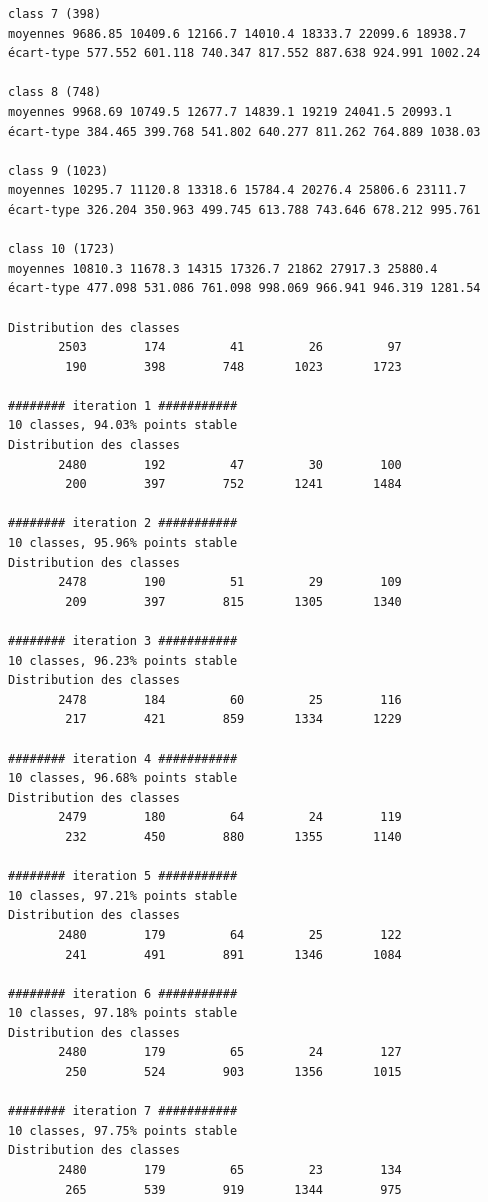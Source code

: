 \documentclass[earth,article,accept,pdftex,moreauthors]{Definitions/mdpi}
\begin{document}
{\begin{scriptsize}
\begin{verbatim}
class 7 (398)
moyennes 9686.85 10409.6 12166.7 14010.4 18333.7 22099.6 18938.7
écart-type 577.552 601.118 740.347 817.552 887.638 924.991 1002.24

class 8 (748)
moyennes 9968.69 10749.5 12677.7 14839.1 19219 24041.5 20993.1
écart-type 384.465 399.768 541.802 640.277 811.262 764.889 1038.03

class 9 (1023)
moyennes 10295.7 11120.8 13318.6 15784.4 20276.4 25806.6 23111.7
écart-type 326.204 350.963 499.745 613.788 743.646 678.212 995.761

class 10 (1723)
moyennes 10810.3 11678.3 14315 17326.7 21862 27917.3 25880.4
écart-type 477.098 531.086 761.098 998.069 966.941 946.319 1281.54

Distribution des classes
       2503        174         41         26         97
        190        398        748       1023       1723

######## iteration 1 ###########
10 classes, 94.03% points stable
Distribution des classes
       2480        192         47         30        100
        200        397        752       1241       1484

######## iteration 2 ###########
10 classes, 95.96% points stable
Distribution des classes
       2478        190         51         29        109
        209        397        815       1305       1340

######## iteration 3 ###########
10 classes, 96.23% points stable
Distribution des classes
       2478        184         60         25        116
        217        421        859       1334       1229

######## iteration 4 ###########
10 classes, 96.68% points stable
Distribution des classes
       2479        180         64         24        119
        232        450        880       1355       1140

######## iteration 5 ###########
10 classes, 97.21% points stable
Distribution des classes
       2480        179         64         25        122
        241        491        891       1346       1084

######## iteration 6 ###########
10 classes, 97.18% points stable
Distribution des classes
       2480        179         65         24        127
        250        524        903       1356       1015

######## iteration 7 ###########
10 classes, 97.75% points stable
Distribution des classes
       2480        179         65         23        134
        265        539        919       1344        975


\end{verbatim}
\end{scriptsize}}
\end{document}
